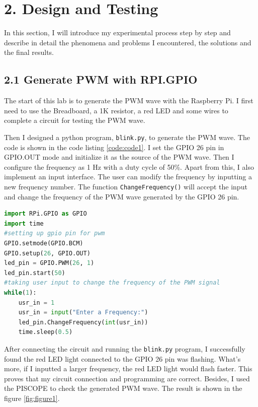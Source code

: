 \documentclass[12pt]{report}
\newcommand{\code}[1]{\colorbox{light-gray}{\texttt{#1}}}
\begin{document}
\section*{2. Design and Testing\vspace{-1em}}
In this section, I will introduce my experimental process step by step and describe in detail the phenomena and problems I encountered, the solutions and the final results.\vspace{-1em}
\subsection*{2.1 Generate PWM with RPI.GPIO}
The start of this lab is to generate the PWM wave with the Raspberry Pi. I first need to use the Breadboard, a 1K resistor, a red LED and some wires to complete a circuit for testing the PWM wave. \par
Then I designed a python program, \code{blink.py}, to generate the PWM wave. The code is shown in the code listing \ref{code:code1}. I set the GPIO 26 pin in GPIO.OUT mode and initialize it as the source of the PWM wave. Then I configure the frequency as 1 Hz with a duty cycle of 50\%. Apart from this, I also implement an input interface. The user can modify the frequency by inputting a new frequency number. The function \code{ChangeFrequency()} will accept the input and change the frequency of the PWM wave generated by the GPIO 26 pin.\par
\begin{center}
\begin{lstlisting}[language=Python, label=code:code1, caption=blink.py] 
import RPi.GPIO as GPIO
import time 
#setting up gpio pin for pwm
GPIO.setmode(GPIO.BCM)
GPIO.setup(26, GPIO.OUT)
led_pin = GPIO.PWM(26, 1)
led_pin.start(50)
#taking user input to change the frequency of the PWM signal
while(1):
    usr_in = 1
    usr_in = input("Enter a Frequency:")
    led_pin.ChangeFrequency(int(usr_in))
    time.sleep(0.5)
\end{lstlisting}
\end{center}\vspace{-2em}
After connecting the circuit and running the \code{blink.py} program, I successfully found the red LED light connected to the GPIO 26 pin was flashing. What's more, if I inputted a larger frequency, the red LED light would flash faster. This proves that my circuit connection and programming are correct. Besides, I used the PISCOPE to check the generated PWM wave. The result is shown in the figure \ref{fig:figure1}.
\end{document}
